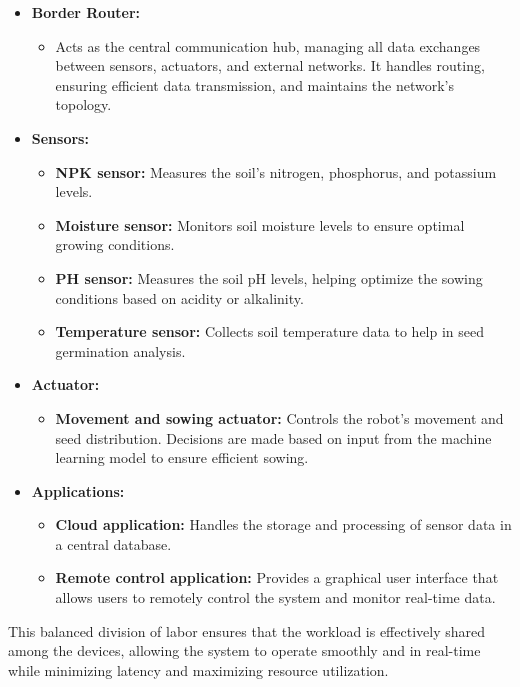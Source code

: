 \begin{itemize} 
    \item \textbf{Border Router:} 
    \begin{itemize} 
        \item Acts as the central communication hub, managing all data exchanges between sensors, actuators, and external networks. It handles routing, ensuring efficient data transmission, and maintains the network's topology.
    \end{itemize} 
    \item \textbf{Sensors:} 
    \begin{itemize} 
        \item \textbf{NPK sensor:} Measures the soil's nitrogen, phosphorus, and potassium levels. 
        \item \textbf{Moisture sensor:} Monitors soil moisture levels to ensure optimal growing conditions. 
        \item \textbf{PH sensor:} Measures the soil pH levels, helping optimize the sowing conditions based on acidity or alkalinity. 
        \item \textbf{Temperature sensor:} Collects soil temperature data to help in seed germination analysis. 
    \end{itemize} \item \textbf{Actuator:} 
    \begin{itemize} \item \textbf{Movement and sowing actuator:} Controls the robot’s movement and seed distribution. Decisions are made based on input from the machine learning model to ensure efficient sowing. 
    \end{itemize} \item \textbf{Applications:} 
    \begin{itemize} \item \textbf{Cloud application:} Handles the storage and processing of sensor data in a central database. 
        \item \textbf{Remote control application:} Provides a graphical user interface that allows users to remotely control the system and monitor real-time data. 
    \end{itemize} 
\end{itemize}

This balanced division of labor ensures that the workload is effectively shared among the devices, allowing the system to operate smoothly and in real-time while minimizing latency and maximizing resource utilization.